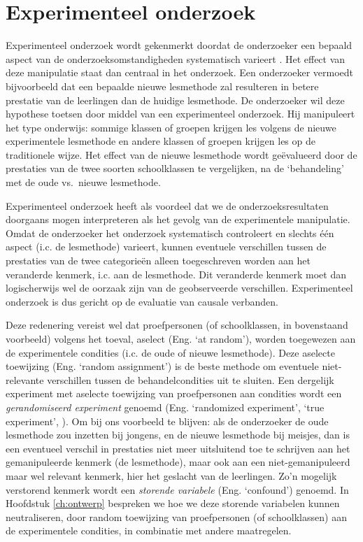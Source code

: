 \documentclass[
]{book}
\begin{document}
\hypertarget{sec:experimenteel-onderzoek}{%
\section{Experimenteel onderzoek}\label{sec:experimenteel-onderzoek}}

Experimenteel onderzoek wordt gekenmerkt doordat de onderzoeker een
bepaald aspect van de onderzoeksomstandigheden systematisch varieert
\citep{SCC02}. Het effect van deze manipulatie staat dan centraal in het
onderzoek. Een onderzoeker vermoedt bijvoorbeeld dat een bepaalde nieuwe
lesmethode zal resulteren in betere prestatie van de leerlingen dan de
huidige lesmethode. De onderzoeker wil deze hypothese toetsen door
middel van een experimenteel onderzoek. Hij manipuleert het type
onderwijs: sommige klassen of groepen krijgen les volgens de nieuwe
experimentele lesmethode en andere klassen of groepen krijgen les op de
traditionele wijze. Het effect van de nieuwe lesmethode wordt
geëvalueerd door de prestaties van de twee soorten schoolklassen te
vergelijken, na de `behandeling' met de oude vs.~nieuwe lesmethode.

Experimenteel onderzoek heeft als voordeel dat we de
onderzoeksresultaten doorgaans mogen interpreteren als het gevolg van de
experimentele manipulatie. Omdat de onderzoeker het onderzoek
systematisch controleert en slechts één aspect (i.c. de lesmethode)
varieert, kunnen eventuele verschillen tussen de prestaties van de twee
categorieën alleen toegeschreven worden aan het veranderde kenmerk, i.c.
aan de lesmethode. Dit veranderde kenmerk moet dan logischerwijs wel de
oorzaak zijn van de geobserveerde verschillen. Experimenteel onderzoek
is dus gericht op de evaluatie van causale verbanden.

Deze redenering vereist wel dat proefpersonen (of schoolklassen, in
bovenstaand voorbeeld) volgens het toeval, aselect (Eng. `at random'),
worden toegewezen aan de experimentele condities (i.c. de oude of nieuwe
lesmethode). Deze aselecte toewijzing (Eng. `random assignment') is de
beste methode om eventuele niet-relevante verschillen tussen de
behandelcondities uit te sluiten. Een dergelijk experiment met aselecte
toewijzing van proefpersonen aan condities wordt een \emph{gerandomiseerd
experiment} genoemd (Eng. `randomized experiment', `true experiment', ).
Om bij ons voorbeeld te blijven: als de onderzoeker de oude lesmethode
zou inzetten bij jongens, en de nieuwe lesmethode bij meisjes, dan is
een eventueel verschil in prestaties niet meer uitsluitend toe te
schrijven aan het gemanipuleerde kenmerk (de lesmethode), maar ook aan
een niet-gemanipuleerd maar wel relevant kenmerk, hier het geslacht van
de leerlingen. Zo'n mogelijk verstorend kenmerk wordt een \emph{storende
variabele} (Eng. `confound') genoemd. In
Hoofdstuk \ref{ch:ontwerp} bespreken we hoe we deze storende variabelen
kunnen neutraliseren, door random toewijzing van proefpersonen (of
schoolklassen) aan de experimentele condities, in combinatie met andere maatregelen.
\end{document}
